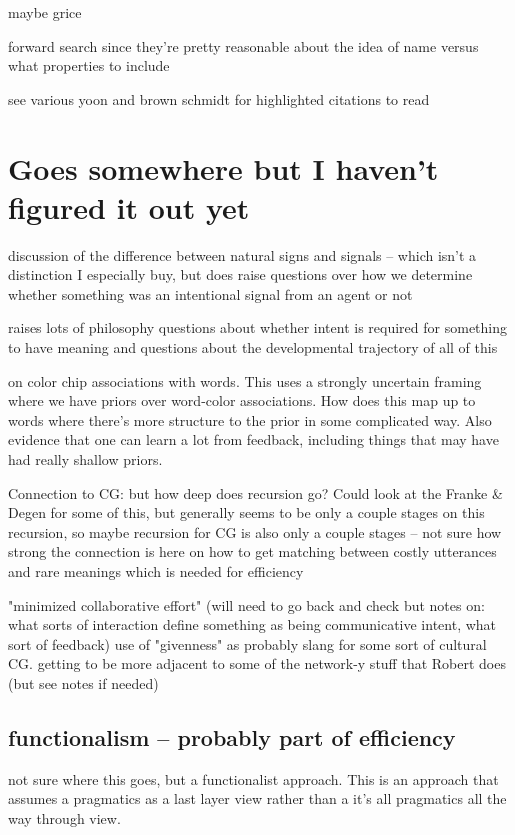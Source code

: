 \documentclass[]{article}
\begin{document}
maybe grice

forward search \cite{heller2012} since they're pretty reasonable about the idea of name versus what properties to include 


see various yoon and brown schmidt for highlighted citations to read 

\section{Goes somewhere but I haven't figured it out yet}
\cite{clark1996}
discussion of the difference between natural signs and signals -- which isn't a distinction I especially buy, but does raise questions over how we determine whether something was an intentional signal from an agent or not 

raises lots of philosophy questions about whether intent is required for something to have meaning and questions about the developmental trajectory of all of this 

\cite{murthy2022} on color chip associations with words. This uses a strongly uncertain framing where we have priors over word-color associations. How does this map up to words where there's more structure to the prior in some complicated way. Also evidence that one can learn a lot from feedback, including things that may have had really shallow priors. 

Connection to CG: but how deep does recursion go? Could look at the Franke \& Degen for some of this, but generally seems to be only a couple stages on this recursion, so maybe recursion for CG is also only a couple stages -- not sure how strong the connection is here
\cite{bergen} on how to get matching between costly utterances and rare meanings which is needed for efficiency


\cite{fay2010} "minimized collaborative effort" (will need to go back and check but notes on: what sorts of interaction define something as being communicative intent, what sort of feedback) use of "givenness" as probably slang for some sort of cultural CG. getting to be more adjacent to some of the network-y stuff that Robert does (but see notes if needed) 

\subsection{functionalism -- probably part of efficiency }

\cite{hawkins1995} not sure where this goes, but a functionalist approach. This is an approach that assumes a pragmatics as a last layer view rather than a it's all pragmatics all the way through view. 
\end{document}
